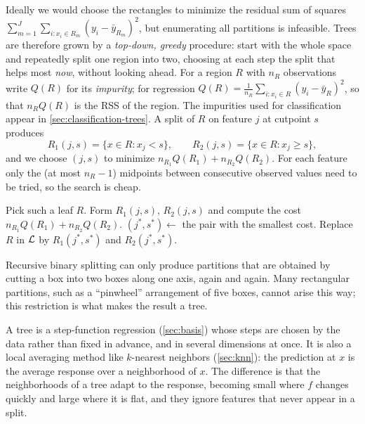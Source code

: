 Ideally we would choose the rectangles to minimize the residual sum of squares $\sum_{m=1}^J\sum_{i:x_i\in R_m}(y_i-\bar y_{R_m})^2$, but enumerating all partitions is infeasible. Trees are therefore grown by a \emph{top-down, greedy} procedure: start with the whole space and repeatedly split one region into two, choosing at each step the split that helps most \emph{now}, without looking ahead. For a region $R$ with $n_R$ observations write $Q(R)$ for its \emph{impurity}; for regression $Q(R)=\frac1{n_R}\sum_{i:x_i\in R}(y_i-\bar y_R)^2$, so that $n_RQ(R)$ is the RSS of the region. The impurities used for classification appear in \cref{sec:classification-trees}. A split of $R$ on feature $j$ at cutpoint $s$ produces
\[
R_1(j,s)=\{x\in R:x_j<s\},\qquad R_2(j,s)=\{x\in R:x_j\ge s\},
\]
and we choose $(j,s)$ to minimize $n_{R_1}Q(R_1)+n_{R_2}Q(R_2)$. For each feature only the (at most $n_R-1$) midpoints between consecutive observed values need to be tried, so the search is cheap.

\begin{algorithm}[H]
\caption{Growing a Tree by Recursive Binary Splitting}\label{alg:tree-grow}
\begin{algorithmic}[1]
  \State Pick such a leaf $R$.
    \State Form $R_1(j,s)$, $R_2(j,s)$ and compute the cost $n_{R_1}Q(R_1)+n_{R_2}Q(R_2)$.
  \EndFor
  \State $(j^*,s^*)\gets$ the pair with the smallest cost.
  \State Replace $R$ in $\mathcal{L}$ by $R_1(j^*,s^*)$ and $R_2(j^*,s^*)$. 
\EndWhile
{}
\end{algorithmic}
\end{algorithm}

Recursive binary splitting can only produce partitions that are obtained by cutting a box into two boxes along one axis, again and again. Many rectangular partitions, such as a ``pinwheel'' arrangement of five boxes, cannot arise this way; this restriction is what makes the result a tree.

\begin{remark}
A tree is a step-function regression (\cref{sec:basis}) whose steps are chosen by the data rather than fixed in advance, and in several dimensions at once. It is also a local averaging method like $k$-nearest neighbors (\cref{sec:knn}): the prediction at $x$ is the average response over a neighborhood of $x$. The difference is that the neighborhoods of a tree adapt to the response, becoming small where $f$ changes quickly and large where it is flat, and they ignore features that never appear in a split.
\end{remark}

